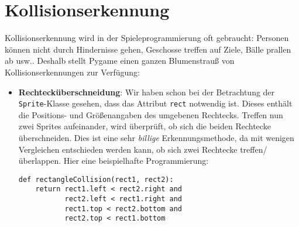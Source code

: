 \newpage
\section{Kollisionserkennung}
Kollisionserkennung wird in der Spieleprogrammierung  oft gebraucht: Personen können nicht durch Hindernisse gehen, Geschosse treffen auf Ziele, Bälle prallen ab usw.. Deshalb stellt Pygame einen ganzen Blumenstrauß von Kollisionserkennungen zur Verfügung:

\begin{itemize}
    \item \textbf{Rechtecküberschneidung}: Wir haben schon bei der Betrachtung der \texttt{Sprite}-Klasse gesehen, dass das Attribut \texttt{rect} notwendig ist. Dieses enthält die Positions- und Größenangaben des umgebenen Rechtecks. Treffen nun zwei Sprites aufeinander, wird überprüft, ob sich die beiden Rechtecke überschneiden. Dies ist eine sehr \emph{billige} Erkennungsmethode, da mit wenigen Vergleichen entschieden werden kann, ob sich zwei Rechtecke treffen/überlappen. Hier eine beispielhafte Programmierung:
\lstset{firstnumber=1}
\begin{lstlisting}
def rectangleCollision(rect1, rect2):
    return rect1.left < rect2.right and
           rect2.left < rect1.right and
           rect1.top < rect2.bottom and
           rect2.top < rect1.bottom
\end{lstlisting}


\begin{figure}[H]
\begin{center}

\end{center}
\end{figure}
\end{itemize}
